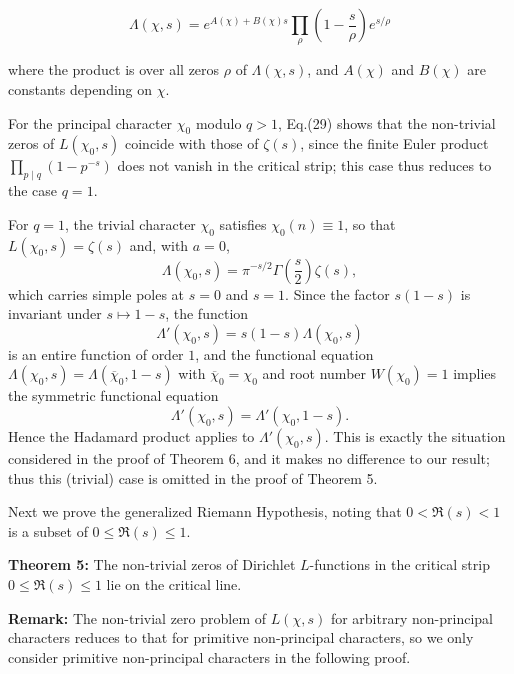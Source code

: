 \documentclass[12pt]{article}
\begin{document}
\begin{equation}\Lambda(\chi, s) = e^{A(\chi) + B(\chi)s} \prod_{\rho} \left(1 - \frac{s}{\rho}\right) e^{s/\rho} \end{equation}

where the product is over all zeros $\rho$ of $\Lambda(\chi, s)$, and $A(\chi)$ and $B(\chi)$ are constants depending on $\chi$.

For the principal character $\chi_0$ modulo $q > 1$, Eq.(29) shows that the
non-trivial zeros of $L(\chi_0, s)$ coincide with those of $\zeta(s)$, since
the finite Euler product $\prod_{p \mid q} \left(1 - p^{-s}\right)$ does not
vanish in the critical strip; this case thus reduces to the case $q = 1$.

For $q = 1$, the trivial character $\chi_0$ satisfies $\chi_0(n) \equiv 1$,
so that $L(\chi_0, s) = \zeta(s)$ and, with $a = 0$,
\begin{equation}\nonumber
\Lambda(\chi_0, s) = \pi^{-s/2} \Gamma\!\left(\frac{s}{2}\right) \zeta(s),
\end{equation}
which carries simple poles at $s = 0$ and $s = 1$. Since the factor $s(1-s)$
is invariant under $s \mapsto 1-s$, the function
\begin{equation}\nonumber
\Lambda'(\chi_0, s) = s(1-s) \Lambda(\chi_0, s)
\end{equation}
is an entire function of order $1$, and the functional equation
$\Lambda(\chi_0, s) = \Lambda(\overline{\chi}_0, 1-s)$ with
$\overline{\chi}_0 = \chi_0$ and root number $W(\chi_0) = 1$ implies the
symmetric functional equation
\begin{equation}\nonumber
\Lambda'(\chi_0, s) = \Lambda'(\chi_0, 1-s).
\end{equation}
Hence the Hadamard product applies to $\Lambda'(\chi_0, s)$. This is
exactly the situation considered in the proof of Theorem 6, and it makes
no difference to our result; thus this (trivial) case is omitted in the
proof of Theorem 5.

Next we prove the generalized Riemann Hypothesis, noting that $0 < \Re(s) < 1$ is a subset of $0 \leq \Re(s) \leq 1$.

\textbf{Theorem 5:} The non-trivial zeros of Dirichlet $L$-functions in the critical strip $0 \leq \Re(s) \leq 1$ lie on the critical line.

\textbf{Remark:} The non-trivial zero problem of $L(\chi, s)$ for arbitrary non-principal characters reduces to that for primitive non-principal characters, so we only consider primitive non-principal characters in the following proof.
\end{document}
